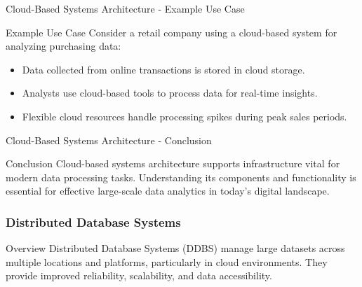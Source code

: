 \documentclass[aspectratio=169]{beamer}
\begin{document}
\begin{frame}[fragile]{Cloud-Based Systems Architecture - Example Use Case}
    \begin{block}{Example Use Case}
        Consider a retail company using a cloud-based system for analyzing purchasing data:
        \begin{itemize}
            \item Data collected from online transactions is stored in cloud storage.
            \item Analysts use cloud-based tools to process data for real-time insights.
            \item Flexible cloud resources handle processing spikes during peak sales periods.
        \end{itemize}
    \end{block}
\end{frame}

\begin{frame}[fragile]{Cloud-Based Systems Architecture - Conclusion}
    \begin{block}{Conclusion}
        Cloud-based systems architecture supports infrastructure vital for modern data processing tasks. Understanding its components and functionality is essential for effective large-scale data analytics in today’s digital landscape.
    \end{block}
\end{frame}

\begin{frame}
    \frametitle{Distributed Database Systems}
    \begin{block}{Overview}
        Distributed Database Systems (DDBS) manage large datasets across multiple locations and platforms, particularly in cloud environments. They provide improved reliability, scalability, and data accessibility.
    \end{block}
\end{frame}
\end{document}
